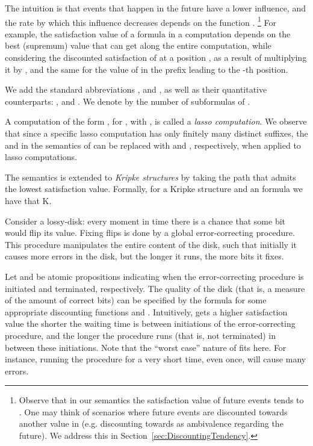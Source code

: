 \documentclass{llncs}
\newcommand{\K}{{\mathcal K}}
\begin{document}
The intuition is that events that happen in the future have a lower influence,
 and the rate by which this influence decreases depends on the function .
\footnote{Observe that in our semantics the satisfaction value of future events tends to . One may think of scenarios where future events are discounted towards another value in  (e.g. discounting towards  as ambivalence regarding the future). We address this in Section~\ref{sec:DiscountingTendency}.} For example, the satisfaction value of a formula  in a computation  depends on the best (supremum) value that  can get along the entire computation, while considering the discounted satisfaction of  at a position , as a result of multiplying it by ,
and the same for the value of  in the prefix leading to the -th position.

We add the standard abbreviations , and , as well as their quantitative counterparts: , and .
We denote by  the number of subformulas of . 

A computation of the form , for , with , is called a {\em lasso computation}. 
We observe that since a specific lasso computation has only finitely many distinct suffixes, the  and  in the semantics of  can be replaced with  and , respectively, when applied to lasso computations.

The semantics is extended to {\em Kripke structures} by taking the path that admits the lowest satisfaction value. Formally, for a Kripke structure  and an  formula  we have that \K.




\begin{example}
Consider a lossy-disk: every moment in time there is a chance that some bit would flip its value. Fixing flips is done by a global error-correcting procedure. This procedure manipulates the entire content of the disk, such that initially it causes more errors in the disk, but the longer it runs, the more bits it fixes. 

Let  and  be atomic propositions indicating when the error-correcting procedure is initiated and terminated, respectively.
The quality of the disk (that is, a measure of the amount of correct bits) can be specified by the formula  for some appropriate discounting functions  and . 
Intuitively,  gets a higher satisfaction value the shorter the waiting time is between initiations of the error-correcting procedure, and the longer the procedure runs (that is, not terminated) in between these initiations. Note that the ``worst case'' nature of  fits here. For instance, running the procedure for a very short time, even once, will cause many errors.
\end{example}
\end{document}
